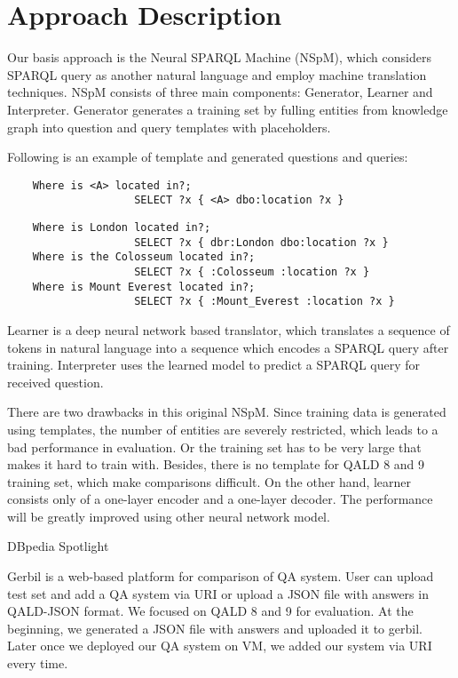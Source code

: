 
\section{Approach Description}

Our basis approach is the Neural SPARQL Machine (NSpM)\cite{soru-marx-nampi2018},
which considers SPARQL query as another natural language and employ machine translation techniques. 
NSpM consists of three main components: 
Generator, Learner and Interpreter. 
Generator generates a training set
by fulling entities from knowledge graph into question and query templates with placeholders. 

Following is an example of template and generated questions and queries:

\begin{verbatim}
    Where is <A> located in?; 
                    SELECT ?x { <A> dbo:location ?x }
\end{verbatim}

\begin{verbatim}
    Where is London located in?; 
                    SELECT ?x { dbr:London dbo:location ?x }
    Where is the Colosseum located in?; 
                    SELECT ?x { :Colosseum :location ?x }
    Where is Mount Everest located in?; 
                    SELECT ?x { :Mount_Everest :location ?x }
\end{verbatim}

Learner is a deep neural network based translator, 
which translates a sequence of tokens in natural language
into a sequence which encodes a SPARQL query after training.
Interpreter uses the learned model to predict a SPARQL query for received question.

There are two drawbacks in this original NSpM.
Since training data is generated using templates, 
the number of entities are severely restricted,
which leads to a bad performance in evaluation.
Or the training set has to be very large
that makes it hard to train with. 
Besides, there is no template for QALD 8 and 9 training set,
which make comparisons difficult. 
On the other hand, 
learner consists only of a one-layer encoder and a one-layer decoder.
The performance will be greatly improved using other neural network model. 

DBpedia Spotlight \cite{isem2013daiber}


Gerbil \cite{gerbil} is a web-based platform for comparison of QA system. 
User can upload test set and add a QA system via URI or upload a JSON file with answers in QALD-JSON format. 
We focused on QALD 8 and 9 for evaluation. 
At the beginning, we generated a JSON file with answers and uploaded it to gerbil. 
Later once we deployed our QA system on VM, we added our system via URI every time. 

